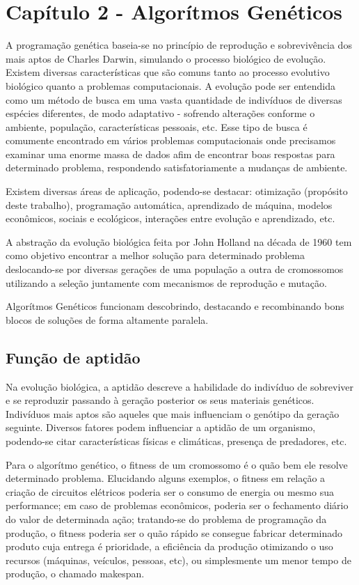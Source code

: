 
\newpage
\section{Capítulo 2 - Algorítmos Genéticos}
A programação genética baseia-se no princípio de reprodução e sobrevivência dos mais aptos de Charles Darwin, simulando o processo biológico de evolução. Existem diversas características que são comuns tanto ao processo evolutivo biológico quanto a problemas computacionais. A evolução pode ser entendida como um método de busca em uma vasta quantidade de indivíduos de diversas espécies diferentes, de modo adaptativo -  sofrendo alterações conforme o ambiente, população, características pessoais, etc. Esse tipo de busca é comumente encontrado em vários problemas computacionais onde precisamos examinar uma enorme massa de dados afim de encontrar boas respostas para determinado problema, respondendo satisfatoriamente a mudanças de ambiente.

Existem diversas áreas de aplicação, podendo-se destacar: otimização (propósito deste trabalho), programação automática, aprendizado de máquina, modelos econômicos, sociais e ecológicos, interações entre evolução e aprendizado, etc.

A abstração da evolução biológica feita por John Holland na década de 1960 tem como objetivo encontrar a melhor solução para determinado problema  deslocando-se por diversas gerações de uma população a outra de cromossomos utilizando a seleção juntamente com mecanismos de reprodução e mutação.

Algorítmos Genéticos funcionam descobrindo, destacando e recombinando bons blocos de soluções de forma altamente paralela. \cite{MITCHELL}

\subsection{Função de aptidão}
Na evolução biológica, a aptidão descreve a habilidade do indivíduo de sobreviver e se reproduzir passando à geração posterior os seus materiais genéticos. Indivíduos mais aptos são aqueles que mais influenciam o genótipo da geração seguinte. Diversos fatores podem influenciar a aptidão de um organismo, podendo-se citar características físicas e climáticas, presença de predadores, etc.

Para o algorítmo genético, o fitness de um cromossomo é o quão bem ele resolve determinado problema. Elucidando alguns exemplos, o fitness em relação a criação de circuitos elétricos poderia ser o consumo de energia ou mesmo sua performance; em caso de problemas econômicos, poderia ser o fechamento diário do valor de determinada ação; tratando-se do problema de programação da produção, o fitness poderia ser o quão rápido se consegue fabricar determinado produto cuja entrega é prioridade, a eficiência da produção otimizando o uso recursos (máquinas, veículos, pessoas, etc), ou simplesmente um menor tempo de produção, o chamado makespan.

